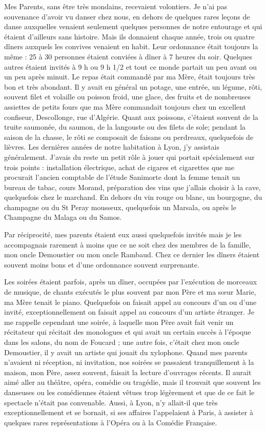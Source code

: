 \documentclass[11pt,a4paper]{report}
\begin{document}
Mes Parents, sans être très mondains, recevaient volontiers. Je n'ai pas souvenance d'avoir vu danser chez nous, en dehors de quelques rares leçons de danse auxquelles venaient seulement quelques personnes de notre entourage et qui étaient d'ailleurs sans histoire. Mais ils donnaient chaque année, trois ou quatre dîners auxquels les convives venaient en habit. Leur ordonnance était toujours la même : 25 à 30 personnes étaient conviées à dîner à 7 heures du soir. Quelques autres étaient invités à 9 h ou 9 h 1/2 et tout ce monde partait un peu avant ou un peu après minuit. Le repas était commandé par ma Mère, était toujours très bon et très abondant. Il y avait en général un potage, une entrée, un légume, rôti, souvent filet et volaille ou poisson froid, une glace, des fruits et de nombreuses assiettes de petits fours que ma Mère commandait toujours chez un excellent confiseur, Descollonge, rue d'Algérie. Quant aux poissons, c'étaient souvent de la truite saumonée, du saumon, de la langouste ou des filets de sole; pendant la saison de la chasse, le rôti se composait de faisans ou perdreaux, quelquefois de lièvres. Les dernières années de notre habitation à Lyon, j'y assistais généralement. J'avais du reste un petit rôle à jouer qui portait spécialement sur trois points : installation électrique, achat de cigares et cigarettes que me procurait l'ancien comptable de l'étude Sanimorte dont la femme tenait un bureau de tabac, cours Morand, préparation des vins que j'allais choisir à la cave, quelquefois chez le marchand. En dehors du vin rouge ou blanc, un bourgogne, du champagne ou du St Peray mousseux, quelquefois un Marsala, ou après le Champagne du Malaga ou du Samos.

Par réciprocité, mes parents étaient eux aussi quelquefois invités mais je les accompagnais rarement à moins que ce ne soit chez des membres de la famille, mon oncle Demoustier ou mon oncle Rambaud. Chez ce dernier les dîners étaient souvent moins bons et d'une ordonnance souvent surprenante.

Les soirées étaient parfois, après un dîner, occupées par l'exécution de morceaux de musique, de chants exécutés le plus souvent par mon Père et ma sœur Marie, ma Mère tenait le piano. Quelquefois on faisait appel au concours d'un ou d'une invité, exceptionnellement on faisait appel au concours d'un artiste étranger. Je me rappelle cependant une soirée, à laquelle mon Père avait fait venir un récitateur qui récitait des monologues et qui avait un certain succès à l'époque dans les salons, du nom de Foucard ; une autre fois, c'était chez mon oncle Demoustier, il y avait un artiste qui jouait du xylophone. Quand mes parents n'avaient ni réception, ni invitation, nos soirées se passaient tranquillement à la maison, mon Père, assez souvent, faisait la lecture d'ouvrages récents. Il aurait aimé aller au théâtre, opéra, comédie ou tragédie, mais il trouvait que souvent les danseuses ou les comédiennes étaient vêtues trop légèrement et que de ce fait le spectacle n'était pas convenable. Aussi, à Lyon, n'y allait-il que très exceptionnellement et se bornait, si ses affaires l'appelaient à Paris, à assister à quelques rares représentations à l'Opéra ou à la Comédie Française.
\end{document}
